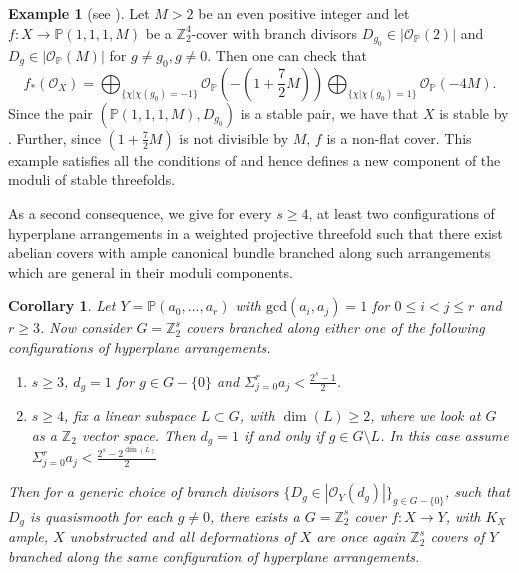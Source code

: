 \documentclass[12pt,twoside,]{amsart}
\theoremstyle{plain}
\newtheorem{corollary}[theorem]{Corollary}
\theoremstyle{definition}
\newtheorem{example}[theorem]{Example}
\begin{document}
\begin{example}[see ]
Let $M > 2$ be an even positive integer and  let $f: X \to \mathbb{P}(1,1,1,M)$ be a $\mathbb{Z}_2^4$-cover with branch divisors $D_{g_0} \in |\mathcal{O}_{\mathbb{P}}(2)|$ and $D_{g} \in |\mathcal{O}_{\mathbb{P}}(M)|$ for $g \neq g_0, g \neq 0$. Then one can check that 
\[
f_*(\mathcal{O}_X) = \bigoplus_{\{\chi | \chi(g_0) = -1\}} \mathcal{O}_{\mathbb{P}}(-(1+\frac{7}{2}M)) \bigoplus_{\{\chi | \chi(g_0) = 1\}} \mathcal{O}_{\mathbb{P}}(-4M).
\]
Since the pair $(\mathbb{P}(1,1,1,M), D_{g_0})$ is a stable pair, we have that $X$ is stable by . Further, since $(1+\frac{7}{2}M)$ is not divisible by $M$, $f$ is a non-flat cover. This example satisfies all the conditions of  and hence defines a new component of the moduli of stable threefolds.
\end{example}

As a second consequence, we give for every $s \geq 4$, at least two configurations of hyperplane arrangements in a weighted projective threefold such that there exist abelian covers with ample canonical bundle branched along such arrangements which are general in their moduli components.
\begin{corollary}\label{hyperplane arrangements intro}
Let $Y = \mathbb{P}(a_0,...,a_r)$ with $\textrm{gcd}(a_i,a_j) = 1$ for $0 \leq i < j \leq r$ and $r \geq 3$. Now consider $G = \mathbb{Z}_2^s$ covers branched along either one of the following configurations of hyperplane arrangements.
    \begin{enumerate}
        \item $s \geq 3$, $d_g = 1$ for $g \in G-\{0\}$ and $\Sigma_{j = 0}^r a_j < \displaystyle\frac{2^s-1}{2}$.
        \item $s \geq 4$, fix a linear subspace $L \subset G$, with $\operatorname{dim}(L) \geq 2$, where we look at $G$ as a $\mathbb{Z}_2$ vector space. Then $d_g = 1$ if and only if $g \in G\setminus L$. In this case assume
        $\Sigma_{j = 0}^r a_j < \displaystyle\frac{2^s-2^{\operatorname{dim}(L)}}{2}$ 
    \end{enumerate}
Then for a generic choice of branch divisors $\{D_g \in |\mathcal{O}_Y(d_g)|\}_{g \in G-\{0\}}$, such that $D_g$ is quasismooth for each $g \neq 0$, there exists a $G = \mathbb{Z}_2^s$ cover $f: X \to Y$, with $K_X$ ample, $X$ unobstructed and all deformations of $X$ are once again $\mathbb{Z}_2^s$ covers of $Y$ branched along the same configuration of hyperplane arrangements.
\end{corollary}
\end{document}

